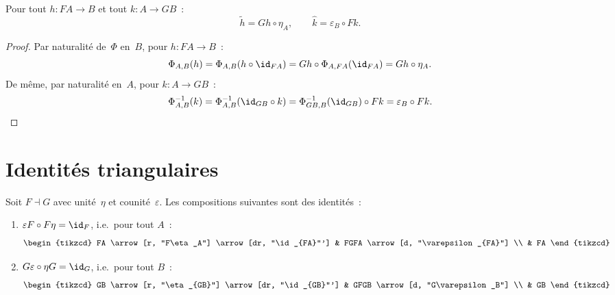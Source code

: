 \begin{proposition}\label{prop:transposee-via-unite}
Pour tout $h\colon FA\to B$ et tout $k\colon A\to GB$~:
\[
    \tilde{h} = Gh\circ\eta_A, \qquad \hat{k} = \varepsilon_B\circ Fk.
\]
\end{proposition}

\begin{proof}
Par naturalité de~$\Phi$ en~$B$, pour $h\colon FA\to B$~:
\[
    \Phi_{A,B}(h)
    = \Phi_{A,B}(h\circ\id_{FA})
    = Gh \circ \Phi_{A,FA}(\id_{FA})
    = Gh\circ\eta_A.
\]
De même, par naturalité en~$A$, pour $k\colon A\to GB$~:
\[
    \Phi^{-1}_{A,B}(k)
    = \Phi^{-1}_{A,B}(\id_{GB}\circ k)
    = \Phi^{-1}_{GB,B}(\id_{GB})\circ Fk
    = \varepsilon_B\circ Fk. \qedhere
\]
\end{proof}


\section{Identités triangulaires}\label{sec:identites-triangulaires}

\begin{theoreme}\label{thm:identites-triangulaires}
Soit $F\dashv G$ avec unité~$\eta$ et counité~$\varepsilon$.
Les compositions suivantes sont des identités~:
\begin{enumerate}[label=(\roman*)]
\item $\varepsilon F\circ F\eta = \id_F$, i.e.\ pour tout $A$~:
\[
\begin{tikzcd}
FA \arrow[r, "F\eta_A"] \arrow[dr, "\id_{FA}"'] & FGFA \arrow[d, "\varepsilon_{FA}"] \\
& FA
\end{tikzcd}
\]
\item $G\varepsilon\circ\eta G = \id_G$, i.e.\ pour tout $B$~:
\[
\begin{tikzcd}
GB \arrow[r, "\eta_{GB}"] \arrow[dr, "\id_{GB}"'] & GFGB \arrow[d, "G\varepsilon_B"] \\
& GB
\end{tikzcd}
\]
\end{enumerate}
\end{theoreme}

